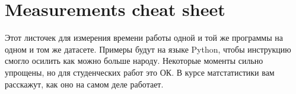 \documentclass{article}
\title{}
\author{}
\begin{document}

\section*{Measurements cheat sheet}

Этот листочек для измерения времени работы одной и той же программы на одном и том же датасете. Примеры будут на языке Python, чтобы инструкцию смогло осилить как можно больше народу. Некоторые моменты сильно упрощены, но для студенческих работ это ОК. В курсе матстатистики вам расскажут, как оно на самом деле работает.
\end{document}

